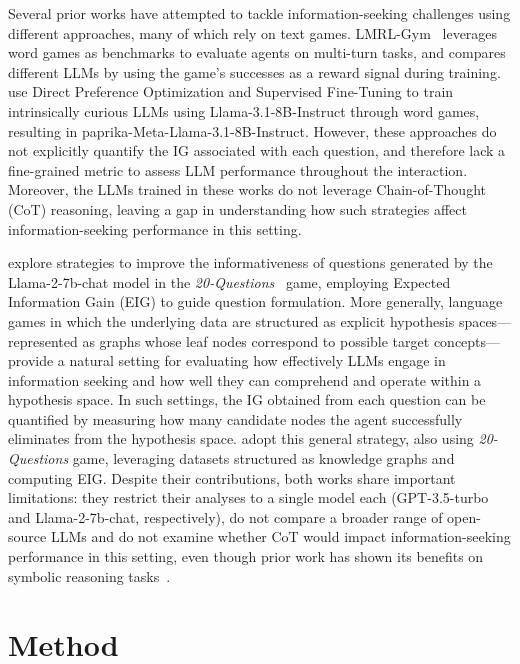 \documentclass[letterpaper]{article} %
\begin{document}
Several prior works have attempted to tackle information-seeking challenges using different approaches, many of which rely on text games. LMRL-Gym~\cite{abdulhai2023lmrlgymbenchmarksmultiturn} leverages word games as benchmarks to evaluate agents on multi-turn tasks, and compares different LLMs by using the game's successes as a reward signal during training. \citet{tajwar2025traininggenerallycuriousagent} use Direct Preference Optimization and Supervised Fine-Tuning to train intrinsically curious LLMs using Llama-3.1-8B-Instruct \cite{grattafiori2024llama3herdmodels} through word games, resulting in paprika-Meta-Llama-3.1-8B-Instruct. However, these approaches do not explicitly quantify the IG associated with each question, and therefore lack a fine-grained metric to assess LLM performance throughout the interaction. Moreover, the LLMs trained in these works do not leverage Chain-of-Thought (CoT) reasoning, leaving a gap in understanding how such strategies affect information-seeking performance in this setting.


\citet{mazzaccara2024learningaskinformativequestions} explore strategies to improve the informativeness of questions generated by the Llama-2-7b-chat model in the \emph{20-Questions}~\cite{MosherHornsby1966} game, employing Expected Information Gain (EIG) to guide question formulation. More generally, language games in which the underlying data are structured as explicit hypothesis spaces—represented as graphs whose leaf nodes correspond to possible target concepts—provide a natural setting for evaluating how effectively LLMs engage in information seeking and how well they can comprehend and operate within a hypothesis space. In such settings, the IG obtained from each question can be quantified by measuring how many candidate nodes the agent successfully eliminates from the hypothesis space. \citet{bertolazzi-etal-2023-chatgpts} adopt this general strategy, also using \emph{20-Questions} game, leveraging datasets structured as knowledge graphs and computing EIG. Despite their contributions, both works share important limitations: they restrict their analyses to a single model each (GPT-3.5-turbo and Llama-2-7b-chat, respectively), do not compare a broader range of open-source LLMs and do not examine whether CoT would impact information-seeking performance in this setting, even though prior work has shown its benefits on symbolic reasoning tasks~\cite{wei2023chainofthoughtpromptingelicitsreasoning}.


\section{Method}
\end{document}
